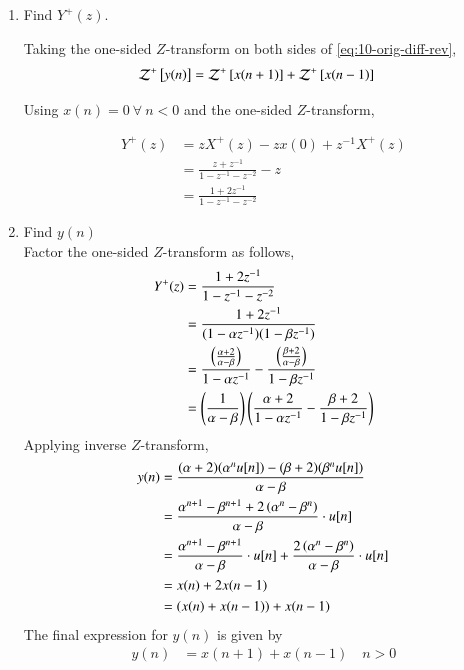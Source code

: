 \documentclass[journal,12pt,twocolumn]{IEEEtran}
\renewcommand\thesection{\arabic{section}}
\begin{document}
\begin{enumerate}[label=\thesection.\arabic*,ref=\thesection.\theenumi]
\item Find $Y^{+}(z)$.

\solution Taking the one-sided $Z$-transform on both sides of \eqref{eq:10-orig-diff-rev},
\begin{align}
&\mathcal{Z}^+{}\left[y(n)\right] = \mathcal{Z}^+{}\left[x(n + 1)\right] + \mathcal{Z}^+{}\left[x(n - 1)\right] 
\end{align}

\hspace{3mm} Using $x(n) = 0\ \forall\ n < 0$ and the one-sided $Z$-transform, 

\begin{align}
Y^+(z) &= zX^+(z) - zx(0) + z^{-1}X^+(z) \\
&= \frac{z + z^{-1}}{1 - z^{-1} - z^{-2}} - z \\
&= \frac{1 + 2z^{-1}}{1 - z^{-1} - z^{-2}}
\label{eq:Y-z}
\end{align}

\item Find $y(n)$ \\
\solution
Factor the one-sided $Z$-transform as follows,
\begin{align}
	Y^+(z) &= \frac{1 + 2z^{-1}}{1 - z^{-1} - z^{-2}}\\
	&= \frac{1 + 2z^{-1}}{(1 - \alpha z^{-1})(1 - \beta z^{-1})}\\
	&= \frac{\left(\frac{\alpha + 2}{\alpha - \beta}\right)}{1 - \alpha z^{-1}} - \frac{\left(\frac{\beta + 2}{\alpha - \beta}\right)}{1 - \beta z^{-1}} \\
	&= \left(\frac{1}{\alpha - \beta}\right) \left(\frac{\alpha + 2}{1 - \alpha z^{-1}} - \frac{\beta + 2}{1 - \beta z^{-1}}\right) 
\end{align}
Applying inverse $Z$-transform, 
\begin{align}
	y(n) &= \frac{(\alpha + 2)({\alpha}^n u[n]) - (\beta + 2)({\beta}^n u[n])}{\alpha - \beta} \\
	&= \frac{{\alpha}^{n+1} - {\beta}^{n+1} + 2 \left(\alpha^n - \beta^n\right)}{\alpha - \beta} \cdot u[n] \\
	&= \frac{{\alpha}^{n+1} - {\beta}^{n+1}}{\alpha - \beta} \cdot u[n] + \frac{2 \left(\alpha^n - \beta^n\right)}{\alpha - \beta} \cdot u[n] \\
	&= x(n) + 2 x(n-1)\\
	&= (x(n) + x(n-1)) + x(n-1) 
\end{align}
The final expression for $y(n)$ is given by 
\begin{align}
	y(n) &= x(n+1) + x(n-1) \quad n > 0
	\label{eq:y_n}
\end{align}
\end{enumerate}
\end{document}

